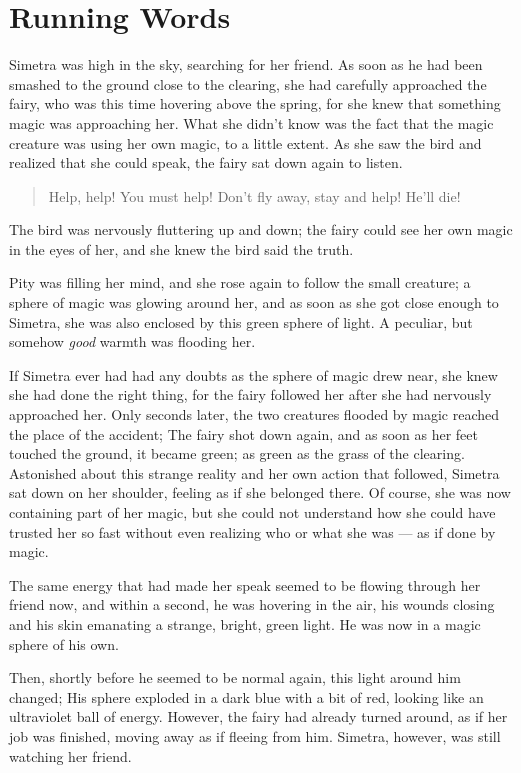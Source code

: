 \chapter{Running Words}
\label{cha:running-words}
Simetra was high in the sky, searching for her friend. As soon as he had been smashed to the ground close to the clearing, she had carefully approached the fairy, who was this time hovering above the spring, for she knew that something magic was approaching her. What she didn't know was the fact that the magic creature was using her own magic, to a little extent. As she saw the bird and realized that she could speak, the fairy sat down again to listen.
\begin{quote}
Help, help! You must help! Don't fly away, stay and help! He'll die!  
\end{quote}
The bird was nervously fluttering up and down; the fairy could see her own magic in the eyes of her, and she knew the bird said the truth.

Pity was filling her mind, and she rose again to follow the small creature; a sphere of magic was glowing around her, and as soon as she got close enough to Simetra, she was also enclosed by this green sphere of light. A peculiar, but somehow \emph{good} warmth was flooding her.

\froufrou{}

If Simetra ever had had any doubts as the sphere of magic drew near, she knew she had done the right thing, for the fairy followed her after she had nervously approached her. Only seconds later, the two creatures flooded by magic reached the place of the accident; The fairy shot down again, and as soon as her feet touched the ground, it became green; as green as the grass of the clearing. Astonished about this strange reality and her own action that followed, Simetra sat down on her shoulder, feeling as if she belonged there. Of course, she was now containing part of her magic, but she could not understand how she could have trusted her so fast without even realizing who or what she was --- as if done by magic.

The same energy that had made her speak seemed to be flowing through her friend now, and within a second, he was hovering in the air, his wounds closing and his skin emanating a strange, bright, green light. He was now in a magic sphere of his own.

Then, shortly before he seemed to be normal again, this light around him changed; His sphere exploded in a dark blue with a bit of red, looking like an ultraviolet ball of energy. However, the fairy had already turned around, as if her job was finished, moving away as if fleeing from him. Simetra, however, was still watching her friend.


